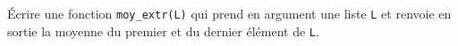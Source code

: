 \exer{}
\setcounter{numques}{0}

\question \'Ecrire une fonction \texttt{moy\_extr(L)} qui prend en argument une liste \texttt{L} et renvoie en sortie la moyenne du premier et du dernier élément de \texttt{L}.
